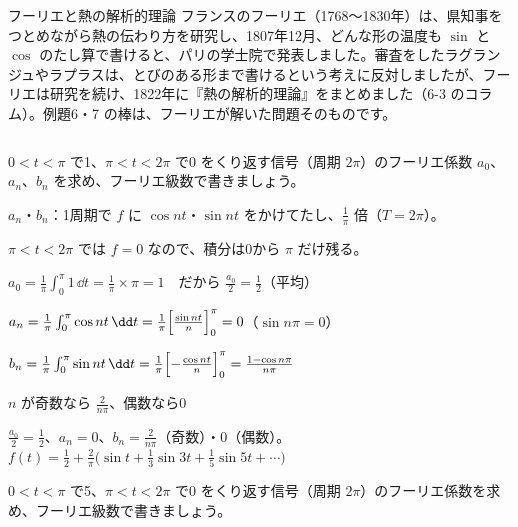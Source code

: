 \begin{column}{フーリエと熱の解析的理論}
フランスのフーリエ（1768〜1830年）は、県知事をつとめながら熱の伝わり方を研究し、1807年12月、どんな形の温度も $\sin$ と $\cos$ のたし算で書けると、パリの学士院で発表しました。審査をしたラグランジュやラプラスは、とびのある形まで書けるという考えに反対しましたが、フーリエは研究を続け、1822年に『熱の解析的理論』をまとめました（6-3 のコラム）。例題6・7 の棒は、フーリエが解いた問題そのものです。
\end{column}

\begin{reidai}[0と1をくり返す信号]
$0<t<\pi$ で1、$\pi<t<2\pi$ で0 をくり返す信号（周期 $2\pi$）のフーリエ係数 $a_0$、$a_n$、$b_n$ を求め、フーリエ級数で書きましょう。\par
\kangaekata {}\par
{}\enspace $a_n$・$b_n$：1周期で $f$ に $\cos nt$・$\sin nt$ をかけてたし、$\frac{1}{\pi}$ 倍（$T=2\pi$）。\par
{}\enspace $\pi<t<2\pi$ では $f=0$ なので、積分は0から $\pi$ だけ残る。\par
\shiki\kixbs $a_0=\frac{1}{\pi}\int_0^{\pi}1\,\dd t=\frac{1}{\pi}\times\pi=1$　だから $\frac{a_0}{2}=\frac12$（平均）\par
\kixba $a_n=\frac{1}{\pi}\int_0^{\pi}\cos nt\,\dd t=\frac{1}{\pi}\Bigl[\frac{\sin nt}{n}\Bigr]_0^{\pi}=0$\quad （$\sin n\pi=0$）\par
\kixba $b_n=\frac{1}{\pi}\int_0^{\pi}\sin nt\,\dd t=\frac{1}{\pi}\Bigl[-\frac{\cos nt}{n}\Bigr]_0^{\pi}=\frac{1-\cos n\pi}{n\pi}$\par
\kixbb $n$ が奇数なら $\frac{2}{n\pi}$、偶数なら0\par
\kotae $\frac{a_0}{2}=\frac12$、$a_n=0$、$b_n=\frac{2}{n\pi}$（奇数）・0（偶数）。\\
\hspace*{2.6\zw}$f(t)=\frac12+\frac{2}{\pi}\bigl(\sin t+\frac13\sin3t+\frac15\sin5t+\cdots\bigr)$
\end{reidai}

\begin{jibun}
$0<t<\pi$ で5、$\pi<t<2\pi$ で0 をくり返す信号（周期 $2\pi$）のフーリエ係数を求め、フーリエ級数で書きましょう。
\end{jibun}

